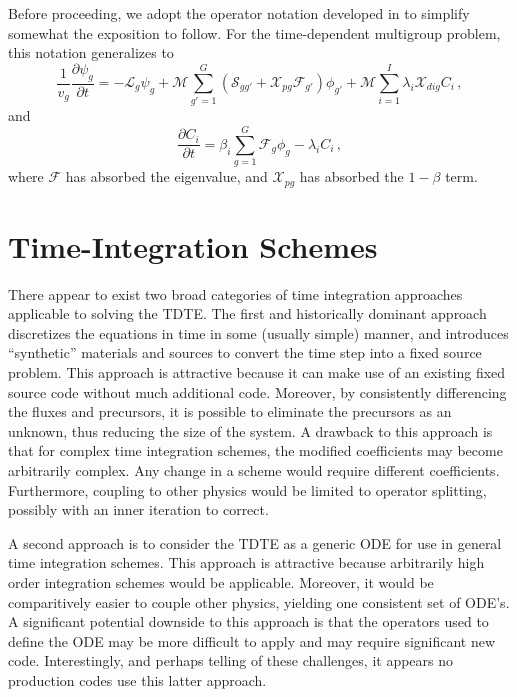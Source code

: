 Before proceeding, we adopt the operator notation developed 
in  to simplify
somewhat the exposition to follow.
For the time-dependent multigroup problem, this notation generalizes to 
\begin{equation}
  \frac{1}{v_g} \frac{\partial \psi_g}{\partial t}
   = -\mathcal{L}_g\psi_g
     + \mathcal{M} \sum_{g'=1}^G 
         \left (
           \mathcal{S}_{gg'} + 
           \mathcal{X}_{pg} \mathcal{F}_{g'} 
         \right )\phi_{g'}
     +  \mathcal{M} \sum_{i=1}^{I} \lambda_i \mathcal{X}_{dig} C_i \, ,
\label{eq:tdteop}
\end{equation}
and
\begin{equation}
 \frac{\partial C_i}{\partial t} =  
  \beta_i \sum_{g=1}^G \mathcal{F}_{g} \phi_{g} - \lambda_i C_i \, ,
\label{eq:precop}
\end{equation}
where $\mathcal{F}$ has absorbed the eigenvalue, and
$\mathcal{X}_{pg} $ has absorbed the $1-\beta$ term.

\section{Time-Integration Schemes}

There appear to exist two broad categories of time integration 
approaches applicable to solving the TDTE.
The first and historically dominant approach discretizes
the equations in time in some (usually
simple) manner, and introduces ``synthetic'' materials and
sources to convert the time step into a fixed source problem.
This approach is attractive because it can make use of 
an existing fixed source code without much additional
code.  Moreover, by consistently differencing the
fluxes and precursors, it is possible to eliminate the 
precursors as an unknown, thus reducing the size of 
the system.  
A drawback to this approach is that for complex
time integration schemes, the modified coefficients may 
become arbitrarily complex. Any change in a scheme would
require different coefficients.  Furthermore, coupling
to other physics would be limited to operator splitting,
possibly with an inner iteration to correct.

A second approach is to consider the TDTE as a generic
ODE for use in general time integration schemes.  This
approach is attractive because arbitrarily high order
integration schemes would be applicable.  Moreover,
it would be comparitively easier to couple other 
physics, yielding one consistent set of ODE's.  
A significant potential downside to this approach is that
the operators used to define the ODE may be more 
difficult to apply and may require significant new
code.  
Interestingly, and perhaps telling of these challenges,
it appears no production codes use this latter approach.

